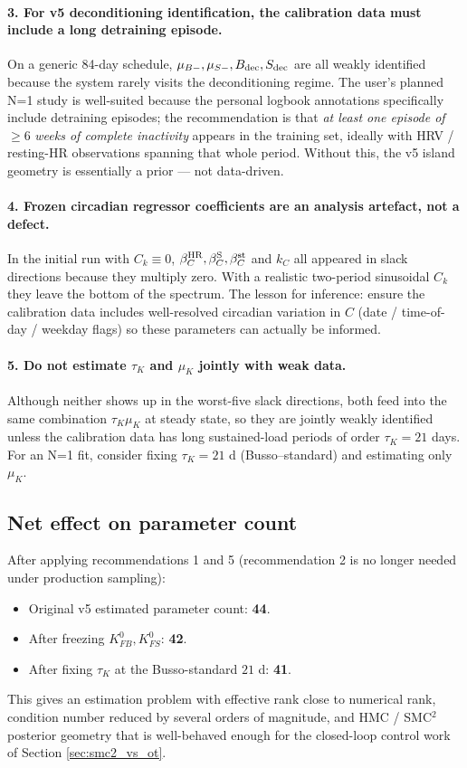 \paragraph{3. For v5 deconditioning identification, the calibration data must include a long detraining episode.}
On a generic 84-day schedule, $\mu_{B-}, \mu_{S-}, B_{\rm dec}, S_{\rm dec}$ are all weakly identified because the system rarely visits the deconditioning regime. The user's planned N=1 study is well-suited because the personal logbook annotations specifically include detraining episodes; the recommendation is that \emph{at least one episode of} $\ge 6$ \emph{weeks of complete inactivity} appears in the training set, ideally with HRV / resting-HR observations spanning that whole period. Without this, the v5 island geometry is essentially a prior --- not data-driven.

\paragraph{4. Frozen circadian regressor coefficients are an analysis artefact, not a defect.}
In the initial run with $C_k \equiv 0$, $\beta_C^{\rm HR}, \beta_C^{\rm S}, \beta_C^{\rm st}$ and $k_C$ all appeared in slack directions because they multiply zero. With a realistic two-period sinusoidal $C_k$ they leave the bottom of the spectrum. The lesson for inference: ensure the calibration data includes well-resolved circadian variation in $C$ (date / time-of-day / weekday flags) so these parameters can actually be informed.

\paragraph{5. Do not estimate $\tau_K$ and $\mu_K$ jointly with weak data.}
Although neither shows up in the worst-five slack directions, both feed into the same combination $\tau_K \mu_K$ at steady state, so they are jointly weakly identified unless the calibration data has long sustained-load periods of order $\tau_K = 21$ days. For an N=1 fit, consider fixing $\tau_K = 21$ d (Busso--standard) and estimating only $\mu_K$.

\subsection{Net effect on parameter count}

After applying recommendations 1 and 5 (recommendation 2 is no longer needed under production sampling):
\begin{itemize}
  \item Original v5 estimated parameter count: \textbf{44}.
  \item After freezing $K_{FB}^0, K_{FS}^0$: \textbf{42}.
  \item After fixing $\tau_K$ at the Busso-standard $21$ d: \textbf{41}.
\end{itemize}
This gives an estimation problem with effective rank close to numerical rank, condition number reduced by several orders of magnitude, and HMC / SMC$^2$ posterior geometry that is well-behaved enough for the closed-loop control work of Section \ref{sec:smc2_vs_ot}.

